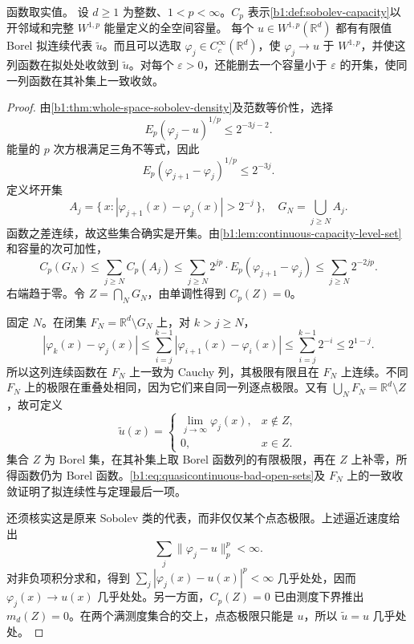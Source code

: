 \begin{theorem}\label{b1:thm:sobolev-quasicontinuous-representative}
函数取实值。
设 \(d\geq1\) 为整数、\(1<p<\infty\)。\(C_p\) 表示\cref{b1:def:sobolev-capacity}以开邻域和完整 \(W^{1,p}\) 能量定义的全空间容量。
每个 \(u\in W^{1,p}(\mathbb R^d)\) 都有有限值 Borel 拟连续代表 \(\widetilde u\)。而且可以选取
\(\varphi_j\in C_c^\infty(\mathbb R^d)\)，使 \(\varphi_j\to u\) 于 \(W^{1,p}\)，并使这列函数在拟处处收敛到 \(\widetilde u\)。对每个 \(\varepsilon>0\)，还能删去一个容量小于 \(\varepsilon\) 的开集，使同一列函数在其补集上一致收敛。
\end{theorem}
\begin{proof}
由\cref{b1:thm:whole-space-sobolev-density}及范数等价性，选择
\[
 E_p(\varphi_j-u)^{1/p}\leq2^{-3j-2}.
\]
能量的 \(p\) 次方根满足三角不等式，因此
\[
 E_p(\varphi_{j+1}-\varphi_j)^{1/p}\leq2^{-3j}.
\]
定义坏开集
\[
 A_j=\{\,x:|\varphi_{j+1}(x)-\varphi_j(x)|>2^{-j}\,\},
 \quad G_N=\bigcup_{j\geq N}A_j.
\]
函数之差连续，故这些集合确实是开集。由\cref{b1:lem:continuous-capacity-level-set}和容量的次可加性，
\begin{equation}\label{b1:eq:quasicontinuous-bad-open-sets}
 C_p(G_N)\leq\sum_{j\geq N}C_p(A_j)
 \leq\sum_{j\geq N}2^{jp}\cdot E_p(\varphi_{j+1}-\varphi_j)
 \leq\sum_{j\geq N}2^{-2jp}.
\end{equation}
右端趋于零。令 \(Z=\bigcap_NG_N\)，由单调性得到 \(C_p(Z)=0\)。

固定 \(N\)。在闭集 \(F_N=\mathbb R^d\setminus G_N\) 上，对 \(k>j\geq N\)，
\[
 |\varphi_k(x)-\varphi_j(x)|
 \leq\sum_{i=j}^{k-1}|\varphi_{i+1}(x)-\varphi_i(x)|
 \leq\sum_{i=j}^{k-1}2^{-i}\leq2^{1-j}.
\]
所以这列连续函数在 \(F_N\) 上一致为 Cauchy 列，其极限有限且在 \(F_N\) 上连续。不同 \(F_N\) 上的极限在重叠处相同，因为它们来自同一列逐点极限。又有
\(\bigcup_NF_N=\mathbb R^d\setminus Z\)，故可定义
\[
 \widetilde u(x)=
 \begin{cases}
 \displaystyle\lim_{j\to\infty}\varphi_j(x),&x\notin Z,\\
 0,&x\in Z.
 \end{cases}
\]
集合 \(Z\) 为 Borel 集，在其补集上取 Borel 函数列的有限极限，再在 \(Z\) 上补零，所得函数仍为 Borel 函数。\eqref{b1:eq:quasicontinuous-bad-open-sets}及 \(F_N\) 上的一致收敛证明了拟连续性与定理最后一项。

还须核实这是原来 Sobolev 类的代表，而非仅仅某个点态极限。上述逼近速度给出
\[
 \sum_j\|\varphi_j-u\|_p^p<\infty.
\]
对非负项积分求和，得到
\(\sum_j|\varphi_j(x)-u(x)|^p<\infty\) 几乎处处，因而
\(\varphi_j(x)\to u(x)\) 几乎处处。另一方面，\(C_p(Z)=0\) 已由测度下界推出 \(m_d(Z)=0\)。在两个满测度集合的交上，点态极限只能是 \(u\)，所以 \(\widetilde u=u\) 几乎处处。
\end{proof}

